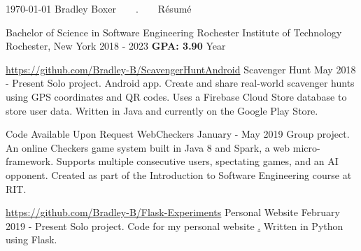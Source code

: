 \documentclass{awesome-cv}
\begin{document}
	\makecvheader[C]

	\makecvfooter
		{\today}
		{Bradley Boxer~~~~.~~~~R\'esum\'e}
		{}


		\begin{cventries}
			\cventry
				{Bachelor of Science in Software Engineering}
				{Rochester Institute of Technology}
				{Rochester, New York}
				{2018 - 2023}
                {\textbf{GPA: 3.90}  Year}
		\end{cventries}

	\cvsection{PROJECTS}
		\begin{cventries}
			\cventry
				{\href{https://github.com/Bradley-B/ScavengerHuntAndroid}{https://github.com/Bradley-B/ScavengerHuntAndroid}}
				{Scavenger Hunt}
				{May 2018 - Present}
				{}
				{Solo project. Android app. Create and share real-world scavenger hunts using GPS coordinates and QR codes. Uses a Firebase Cloud Store database to store user data. Written in Java and currently on the Google Play Store.}

			\cventry
				{Code Available Upon Request}
				{WebCheckers}
				{January - May 2019}
				{}
				{Group project. An online Checkers game system built in Java 8 and Spark, a web micro-framework. Supports multiple consecutive users, spectating games, and an AI opponent. Created as part of the Introduction to Software Engineering course at RIT.}

            		\cventry
                		{\href{https://github.com/Bradley-B/Flask-Experiments}{https://github.com/Bradley-B/Flask-Experiments}}
                		{Personal Website}
                		{February 2019 - Present}
                		{}
                		{Solo project. Code for my personal website \href{http://bradleyboxer.com}. Written in Python using Flask.}

		\end{cventries}
\end{document}

